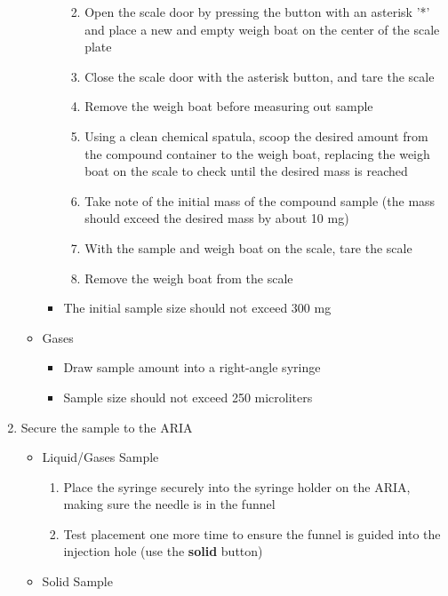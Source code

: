 \begin{enumerate}
\begin{itemize}
\begin{itemize}
      \begin{enumerate}
      \def\labelenumii{\arabic{enumii}.}
      \tightlist
      \item
        Open the scale door by pressing the button with an asterisk '*'
        and place a new and empty weigh boat on the center of the scale
        plate
      \item
        Close the scale door with the asterisk button, and tare the
        scale
      \item
        Remove the weigh boat before measuring out sample
      \item
        Using a clean chemical spatula, scoop the desired amount from
        the compound container to the weigh boat, replacing the weigh
        boat on the scale to check until the desired mass is reached
      \item
        Take note of the initial mass of the compound sample (the mass
        should exceed the desired mass by about 10 mg)
      \item
        With the sample and weigh boat on the scale, tare the scale
      \item
        Remove the weigh boat from the scale
      \end{enumerate}
    \item
      The initial sample size should not exceed 300 mg
    \end{itemize}
  \item
    Gases

    \begin{itemize}
    \tightlist
    \item
      Draw sample amount into a right-angle syringe\\
    \item
      Sample size should not exceed 250 microliters
    \end{itemize}
  \end{itemize}
\item
  Secure the sample to the ARIA

  \begin{itemize}
  \item
    Liquid/Gases Sample

    \begin{enumerate}
    \def\labelenumii{\arabic{enumii}.}
    \tightlist
    \item
      Place the syringe securely into the syringe holder on the ARIA,
      making sure the needle is in the funnel
    \item
      Test placement one more time to ensure the funnel is guided into
      the injection hole (use the \textbf{solid} button)
    \end{enumerate}
  \item
    Solid Sample


\end{itemize}
\end{enumerate}
